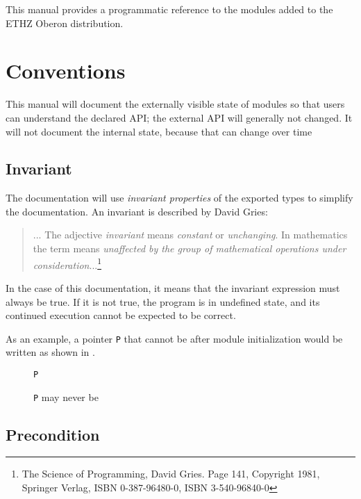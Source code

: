 
This manual provides a programmatic reference to the modules added to
the ETHZ Oberon distribution.

\section{Conventions}

This manual will document the externally visible state of modules so
that users can understand the declared API; the external API will
generally not changed.  It will not document the internal state,
because that can change over time

\subsection{Invariant}\label{intro:invariant}

The documentation will use \emph{invariant properties} of the exported
types to simplify the documentation.  An invariant is described by
David Gries:

\begin{quote}
... The adjective \emph{invariant} means \emph{constant} or
  \emph{unchanging}.  In mathematics the term means \emph{unaffected
    by the group of mathematical operations under
    consideration}...\footnote{The Science of Programming, David
    Gries.  Page 141, Copyright 1981, Springer Verlag, ISBN
    0-387-96480-0, ISBN 3-540-96840-0}
\end{quote}

In the case of this documentation, it means that the invariant
expression must always be true.  If it is not true, the program is in
undefined state, and its continued execution cannot be expected to be
correct.

As an example, a pointer \texttt{P} that cannot be \nil after
module initialization would be written as shown in
.

\begin{figure}[h]
  \begin{invariant}
    \texttt{P} \neq \nil
  \end{invariant}
  \caption{\texttt{P} may never be \nil}\label{fig:intro:invariant}
\end{figure}

\subsection{Precondition}

